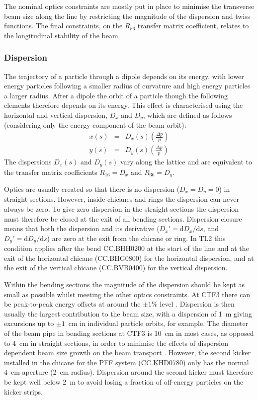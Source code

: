 The nominal optics constraints are mostly put in place to minimise the transverse beam size along the line by restricting the magnitude of the dispersion and twiss functions. The final constraints, on the \(R_{56}\) transfer matrix coefficient, relates to the longitudinal stability of the beam.

\subsubsection{Dispersion}

The trajectory of a particle through a dipole depends on its energy, with lower energy particles following a smaller radius of curvature and high energy particles a larger radius. After a dipole the orbit of a particle though the following elements therefore depends on its energy. This effect is characterised using the horizontal and vertical dispersion, \(D_x\) and \(D_y\), which are defined as follows (considering only the energy component of the beam orbit):
\begin{eqnarray}
x(s) &=& D_x(s)\left(\frac{\Delta p}{p}\right) \\
y(s) &=& D_y(s)\left(\frac{\Delta p}{p}\right)
\end{eqnarray}
The dispersions \(D_x(s)\) and \(D_y(s)\) vary along the lattice and are equivalent to the transfer matrix coefficients \(R_{16} = D_x\) and \(R_{36} = D_y\). 

Optics are usually created so that there is no dispersion (\(D_{x} = D_{y} = 0\)) in straight sections. However, inside chicanes and rings the dispersion can never always be zero. To give zero dispersion in the straight sections the dispersion must therefore be closed at the exit of all bending sections. Dispersion closure means that both the dispersion and its derivative (\(D_x' = \mathrm{d}D_x/\mathrm{d}s\), and \(D_y' = \mathrm{d}D_y/\mathrm{d}s\)) are zero at the exit from the chicane or ring. In TL2 this condition applies after the bend CC.BHH0200 at the start of the line and at the exit of the horizontal chicane (CC.BHG0800) for the horizontal dispersion, and at the exit of the vertical chicane (CC.BVB0400) for the vertical dispersion.

Within the bending sections the magnitude of the dispersion should be kept as small as possible whilst meeting the other optics constraints. At CTF3 there can be peak-to-peak energy offsets at around the \(\pm1\%\) level \cite{CTF3}. Dispersion is then usually the largest contribution to the beam size, with a dispersion of 1~m giving excursions up to \(\pm1\)~cm in individual particle orbits, for example. The diameter of the beam pipe in bending sections at CTF3 is 10~cm in most cases, as opposed to 4~cm in straight sections, in order to minimise the effects of dispersion dependent beam size growth on the beam transport \cite{CTF3}. However, the second kicker installed in the chicane for the PFF system (CC.KHD0780) only has the normal 4~cm aperture (2~cm radius).  Dispersion around the second kicker must therefore be kept well below 2~m to avoid losing a fraction of off-energy particles on the kicker strips.

